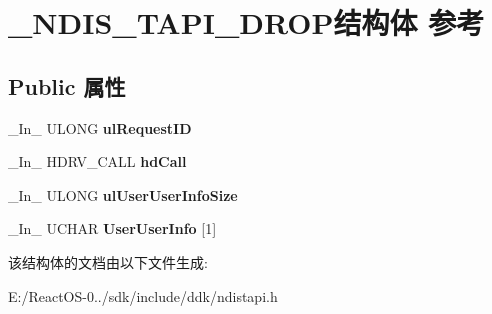 \hypertarget{struct___n_d_i_s___t_a_p_i___d_r_o_p}{}\section{\+\_\+\+N\+D\+I\+S\+\_\+\+T\+A\+P\+I\+\_\+\+D\+R\+O\+P结构体 参考}
\label{struct___n_d_i_s___t_a_p_i___d_r_o_p}
\subsection*{Public 属性}
\begin{DoxyCompactItemize}
\item 
\mbox{\label{struct___n_d_i_s___t_a_p_i___d_r_o_p_a1c58f427abad08fe4069be2479a857f5}} 
\+\_\+\+In\+\_\+ U\+L\+O\+NG {\bfseries ul\+Request\+ID}
\item 
\mbox{\label{struct___n_d_i_s___t_a_p_i___d_r_o_p_ab7d9190d24be31f965ad6c38c1bf9829}} 
\+\_\+\+In\+\_\+ H\+D\+R\+V\+\_\+\+C\+A\+LL {\bfseries hd\+Call}
\item 
\mbox{\label{struct___n_d_i_s___t_a_p_i___d_r_o_p_a89e330ea9b7b94276597178cea28b847}} 
\+\_\+\+In\+\_\+ U\+L\+O\+NG {\bfseries ul\+User\+User\+Info\+Size}
\item 
\mbox{\label{struct___n_d_i_s___t_a_p_i___d_r_o_p_a33ef986cc1702b62d20c86155993d202}} 
\+\_\+\+In\+\_\+ U\+C\+H\+AR {\bfseries User\+User\+Info} \mbox{[}1\mbox{]}
\end{DoxyCompactItemize}


该结构体的文档由以下文件生成\+:\begin{DoxyCompactItemize}
\item 
E\+:/\+React\+O\+S-\/0../sdk/include/ddk/ndistapi.\+h\end{DoxyCompactItemize}
